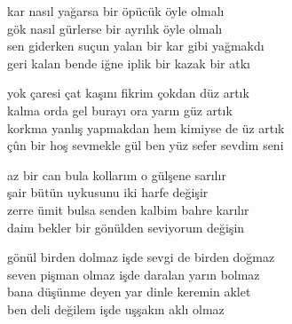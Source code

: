 \documentclass[10pt, openright, oneside]{memoir}
\theoremstyle{definition}
\begin{document}
\vspace*{\fill}
%
\newpage
{}
\vspace*{\fill}
\settowidth{\versewidth}{sen giderken suçun yalan bir kar gibi yağmakdı}
\begin{cverse}
  kar nasıl yağarsa bir öpücük öyle olmalı \\
  gök nasıl gürlerse bir ayrılık öyle olmalı \\
  sen giderken suçun yalan bir kar gibi yağmakdı \\
  geri kalan bende iğne iplik bir kazak bir atkı \\
\end{cverse}
\vspace*{\fill}
%
\newpage
{}
\vspace*{\fill}
\settowidth{\versewidth}{çûn bir hoş sevmekle gül ben yüz sefer sevdim seni}
\begin{cverse}
  yok çaresi çat kaşını fikrim çokdan düz artık \\
  kalma orda gel burayı ora yarın güz artık \\
  korkma yanlış yapmakdan hem kimiyse de üz artık \\
  çûn bir hoş sevmekle gül ben yüz sefer sevdim seni \\
\end{cverse}
\vspace*{\fill}
%
\newpage
{}
\vspace*{\fill}
\settowidth{\versewidth}{zerre ümit bulsa senden kalbim bahre karılır}
\begin{cverse}
  az bir can bula kollarım o gülşene sarılır \\
  şair bütün uykusunu iki harfe değişir \\
  zerre ümit bulsa senden kalbim bahre karılır \\
  daim bekler bir gönülden seviyorum değişin \\
\end{cverse}
\vspace*{\fill}
%
\newpage
{}
\vspace*{\fill}
\settowidth{\versewidth}{gönül birden dolmaz işde sevgi de birden doğmaz}
\begin{cverse}
  gönül birden dolmaz işde sevgi de birden doğmaz \\
  seven pişman olmaz işde daralan yarın bolmaz \\
  bana düşünme deyen yar dinle keremin aklet \\
  ben deli değilem işde uşşakın aklı olmaz \\
\end{cverse}
\end{document}
